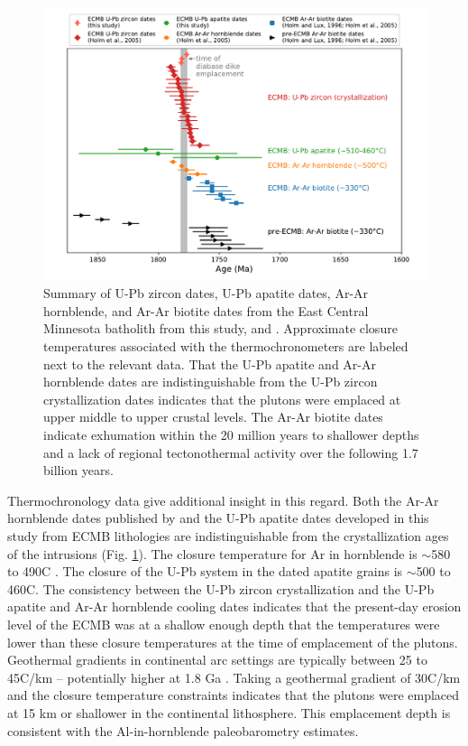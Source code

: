 \documentclass[draft]{agujournal2019}
\begin{document}
\begin{figure}[!ht]
\centering
\noindent\includegraphics[width=\textwidth]{./figures/ECMB_dates_thermochron.pdf}
\caption{\small{Summary of U-Pb zircon dates, U-Pb apatite dates, Ar-Ar hornblende, and Ar-Ar biotite dates from the East Central Minnesota batholith from this study,  and . Approximate closure temperatures associated with the thermochronometers are labeled next to the relevant data. That the U-Pb apatite and Ar-Ar hornblende dates are indistinguishable from the U-Pb zircon crystallization dates indicates that the plutons were emplaced at upper middle to upper crustal levels. The Ar-Ar biotite dates indicate exhumation within the 20 million years to shallower depths and a lack of regional tectonothermal activity over the following 1.7 billion years.}}
\label{fig:thermochron_dates}
\end{figure}

Thermochronology data give additional insight in this regard. Both the Ar-Ar hornblende dates published by  and the U-Pb apatite dates developed in this study from ECMB lithologies are indistinguishable from the crystallization ages of the intrusions (Fig. \ref{fig:thermochron_dates}). The closure temperature for Ar in hornblende is $\sim$580 to 490\textdegree C \cite{Harrison1982a}. The closure of the U-Pb system in the dated apatite grains is $\sim$500 to 460\textdegree C. The consistency between the U-Pb zircon crystallization and the U-Pb apatite and Ar-Ar hornblende cooling dates indicates that the present-day erosion level of the ECMB was at a shallow enough depth that the temperatures were lower than these closure temperatures at the time of emplacement of the plutons. Geothermal gradients in continental arc settings are typically between 25 to 45\textdegree C/km -- potentially higher at 1.8 Ga \cite{Rothstein2003a}. Taking a geothermal gradient of 30\textdegree C/km and the closure temperature constraints indicates that the plutons were emplaced at 15 km or shallower in the continental lithosphere. This emplacement depth is consistent with the Al-in-hornblende paleobarometry estimates. 
\end{document}
